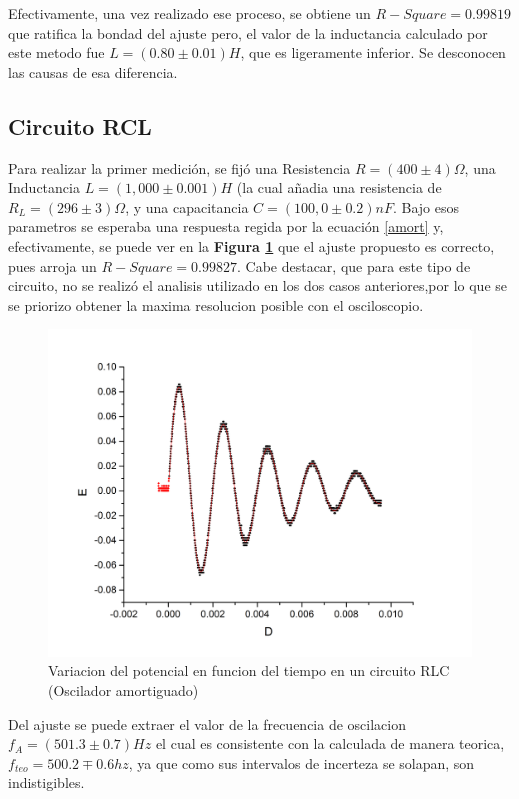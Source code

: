 \documentclass[11pt,a4paper]{article}
\begin{document}
Efectivamente, una vez realizado ese proceso, se obtiene un $R-Square = 0.99819$ que ratifica la bondad del ajuste pero, el valor de la inductancia calculado por este metodo fue $L = (0.80 \pm 0.01) H$, que es ligeramente inferior. Se desconocen las causas de esa diferencia.


\subsection{Circuito RCL}

Para realizar la primer medición, se fijó una Resistencia $R= (400 \pm 4) \Omega$, una Inductancia $L = (1,000 \pm 0.001) H$ (la cual añadia una resistencia de $R_{L} = (296 \pm 3) \Omega$, y una capacitancia $C = (100,0 \pm 0.2) nF$. Bajo esos parametros se esperaba una respuesta regida por la ecuación \eqref{amort} y, efectivamente, se puede ver en la \textbf{Figura \ref{fig:RLC-A}} que el ajuste propuesto es correcto, pues arroja un $R-Square = 0.99827$. Cabe destacar, que para este tipo de circuito, no se realizó el analisis utilizado en los dos casos anteriores,por lo que se se priorizo obtener la maxima resolucion posible con el osciloscopio.

\begin{figure}[H]
\centering
\includegraphics[scale=0.45]{RLC-Amortiguado(1H)}
  \caption{Variacion del potencial en funcion del tiempo en un circuito RLC (Oscilador amortiguado)}
  \label{fig:RLC-A}
\end{figure}

Del ajuste se puede extraer el valor de la frecuencia de oscilacion $f_{A} = (501.3 \pm 0.7) Hz$ el cual es consistente con la calculada de manera teorica, $f_{teo} = 500.2 \mp 0.6 hz$, ya que como sus intervalos de incerteza se solapan, son indistigibles.
\end{document}
